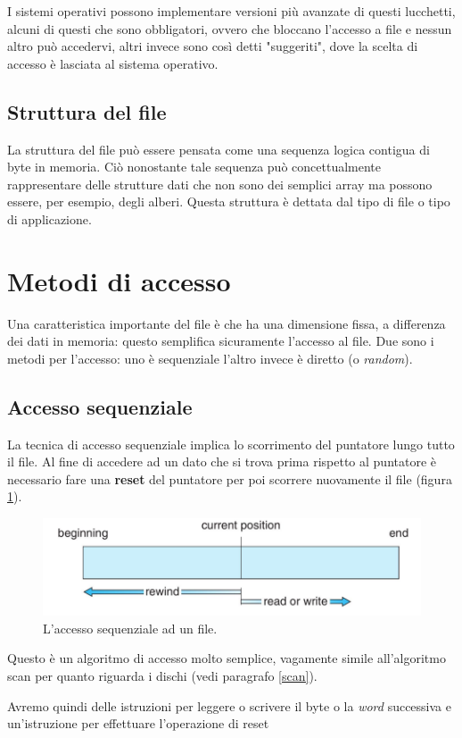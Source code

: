I sistemi operativi possono implementare versioni più avanzate di questi lucchetti, alcuni di questi che sono obbligatori, ovvero che bloccano l'accesso a file e nessun altro può accedervi, altri invece sono così detti "suggeriti", dove la scelta di accesso è lasciata al sistema operativo.

% 
\subsection{Struttura del file}
La struttura del file può essere pensata come una sequenza logica contigua di byte in memoria. Ciò nonostante tale sequenza può concettualmente rappresentare delle strutture dati che non sono dei semplici array ma possono essere, per esempio, degli alberi. Questa struttura è dettata dal tipo di file o tipo di applicazione.

%
\section{Metodi di accesso}
Una caratteristica importante del file è che ha una dimensione fissa, a differenza dei dati in memoria: questo semplifica sicuramente l'accesso al file. Due sono i metodi per l'accesso: uno è sequenziale l'altro invece è diretto (o \textit{random}).

\subsection{Accesso sequenziale}
La tecnica di accesso sequenziale implica lo scorrimento del puntatore lungo tutto il file. Al fine di accedere ad un dato che si trova prima rispetto al puntatore è necessario fare una \textbf{reset} del puntatore per poi scorrere nuovamente il file (figura \ref{fig:accesso sequenziale}).
\begin{figure}[h]
    \centering
    \includegraphics[width = .5\textwidth]{../res/imgs/file system interface/accesso sequenziale.png}
    \caption{L'accesso sequenziale ad un file.}
    \label{fig:accesso sequenziale}
\end{figure}
Questo è un algoritmo di accesso molto semplice, vagamente simile all'algoritmo scan per quanto riguarda i dischi (vedi paragrafo \ref{scan}).

Avremo quindi delle istruzioni per leggere o scrivere il byte o la \textit{word} successiva e un'istruzione per effettuare l'operazione di reset

